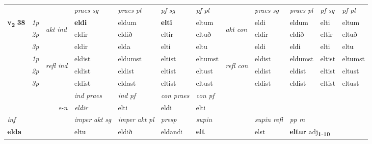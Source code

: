 \begin{longtable}[l]{X>{\footnotesize\itshape}llXXXXlXXXX}
 & &   & \textit{praes sg}  & \textit{praes pl}    & \textit{ pf sg} & \textit{pf pl} & & \textit{praes sg}  & \textit{praes pl}    & \textit{pf sg} & \textit{pf pl }  \\ \cmidrule{4-7} \cmidrule{9-12}
 \multirow{2}{*}{{{\textbf{v{\textsubscript{2}}} \Large{\textbf{38}}}}}  & 1p & \multirow{3}{*}{\begin{turn}{90}\textit{akt ind}\end{turn}} & \textbf{eldi} & eldum & \textbf{elti} & eltum & \multirow{3}{*}{\begin{turn}{90}\textit{akt con}\end{turn}} &eldi & eldum & elti & eltum\\*
 & 2p &  &  eldir  & eldið & eltir & eltuð & & eldir & eldið & eltir & eltuð \\*
 & 3p &  & eldir & elda & elti & eltu & & eldi & eldi& elti & eltu \\*
\cmidrule{4-7} \cmidrule{9-12}
 & 1p & \multirow{3}{*}{\begin{turn}{90}\textit{refl ind}\end{turn}}  & eldist & eldumst & eltist & eltumst & \multirow{3}{*}{\begin{turn}{90}\textit{refl con}\end{turn}}  &eldist & eldumst & eltist & eltumst \\*
 & 2p &  & eldist & eldist & eltist & eltust & &eldist & eldist & eltist & eltust \\*
 & 3p  & & eldist & eldast & eltist & eltust & & eldist & eldist& eltist & eltust \\*
\cmidrule{4-7} \cmidrule{9-12}

   && &  \textit{ind praes} & \textit{ind pf} & \textit{con praes} & \textit{con pf} \\*
\multicolumn{3}{r}{\textit{e-n}} & eldir & elti & eldi & elti \\*

\cmidrule{4-7}
   {\textit{inf}} & &  & \textit{imper akt sg} & \textit{imper akt pl}   & \textit{presp} & \textit{supin} && \textit{supin refl} & \textit{pp m} \\*
  {\textbf{elda}} & && eltu  & eldið   & eldandi &  \textbf{elt} && elst & \multicolumn{2}{l}{\textbf{eltur} adj\textbf{\textsubscript{1-10}}} \\*

\midrule


\end{longtable}
